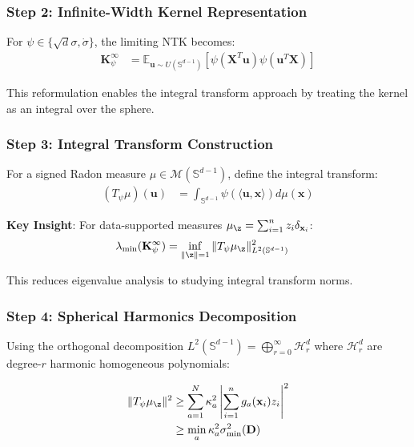 \documentclass{article}
\newcommand{\x}{\mathbf{x}}
\newcommand{\u}{\mathbf{u}}
\begin{document}
\subsubsection{Step 2: Infinite-Width Kernel Representation}

For $\psi \in \{\sqrt{d}\sigma, \dot{\sigma}\}$, the limiting NTK becomes:
\begin{align*}
    \mathbf{K}^{\infty}_{\psi} &= \mathbb{E}_{\mathbf{u} \sim U(\mathbb{S}^{d-1})}[\psi(\mathbf{X}^T\mathbf{u})\psi(\mathbf{u}^T\mathbf{X})]
\end{align*}

This reformulation enables the integral transform approach by treating the kernel as an integral over the sphere.

\subsubsection{Step 3: Integral Transform Construction}

For a signed Radon measure $\mu \in \mathcal{M}(\mathbb{S}^{d-1})$, define the integral transform:
\begin{align*}
    (T_{\psi}\mu)(\u) &= \int_{\mathbb{S}^{d-1}} \psi(\langle \u, \x \rangle) d\mu(\x)
\end{align*}

\textbf{Key Insight}: For data-supported measures $\mu_{\z} = \sum_{i=1}^n z_i \delta_{\x_i}$:
\begin{align}
    \lambda_{\min}(\mathbf{K}_{\psi}^{\infty}) &= \inf_{\|\z\|=1} \|T_{\psi}\mu_{\z}\|_{L^2(\mathbb{S}^{d-1})}^2
\end{align}

This reduces eigenvalue analysis to studying integral transform norms.

\subsubsection{Step 4: Spherical Harmonics Decomposition}

Using the orthogonal decomposition $L^2(\mathbb{S}^{d-1}) = \bigoplus_{r=0}^{\infty} \mathcal{H}_r^d$ where $\mathcal{H}_r^d$ are degree-$r$ harmonic homogeneous polynomials:

\begin{align}
    \|T_{\psi}\mu_{\z}\|^2 &\geq \sum_{a=1}^N \kappa_a^2 \left|\sum_{i=1}^n g_a(\x_i) z_i\right|^2 \\
    &\geq \min_a \kappa_a^2 \sigma_{\min}^2(\mathbf{D})
\end{align}
\end{document}
